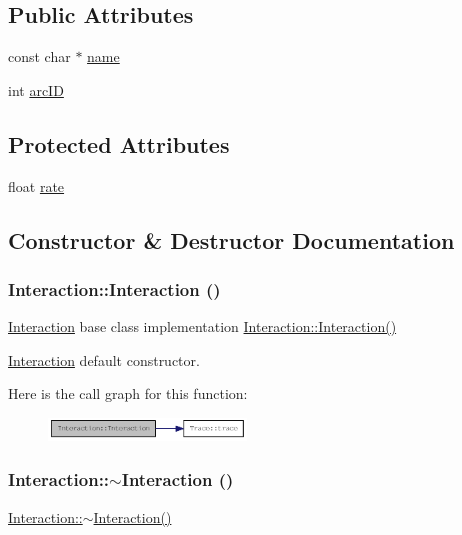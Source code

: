 \subsection*{Public Attributes}
\begin{DoxyCompactItemize}
\item 
const char $\ast$ \hyperlink{classInteraction_a32877e378c8312363a02622d09ae67d4}{name}
\item 
int \hyperlink{classInteraction_a3f30aa82589c3b34bb2feb0b09835aad}{arcID}
\end{DoxyCompactItemize}
\subsection*{Protected Attributes}
\begin{DoxyCompactItemize}
\item 
float \hyperlink{classInteraction_a0a5f4ea012be478c8fe13de552ea5055}{rate}
\end{DoxyCompactItemize}


\subsection{Constructor \& Destructor Documentation}
\hypertarget{classInteraction_aadfd0e254296043c26508d47090ace76}{
\subsubsection[{Interaction}]{\setlength{\rightskip}{0pt plus 5cm}Interaction::Interaction ()}}
\label{classInteraction_aadfd0e254296043c26508d47090ace76}
\hyperlink{classInteraction}{Interaction} base class implementation \hyperlink{classInteraction_aadfd0e254296043c26508d47090ace76}{Interaction::Interaction()}

\hyperlink{classInteraction}{Interaction} default constructor. 

Here is the call graph for this function:\nopagebreak
\begin{figure}[H]
\begin{center}
\leavevmode
\includegraphics[width=149pt]{classInteraction_aadfd0e254296043c26508d47090ace76_cgraph}
\end{center}
\end{figure}
\hypertarget{classInteraction_a6610199fedc7fae617003cb2f397c825}{
\subsubsection[{$\sim$Interaction}]{\setlength{\rightskip}{0pt plus 5cm}Interaction::$\sim$Interaction ()}}
\label{classInteraction_a6610199fedc7fae617003cb2f397c825}
\hyperlink{classInteraction_a6610199fedc7fae617003cb2f397c825}{Interaction::$\sim$Interaction()}

